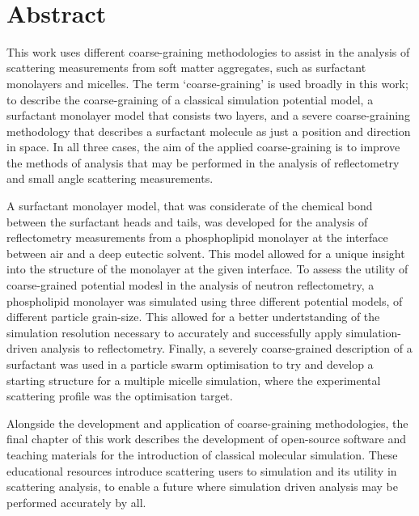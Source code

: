 \documentclass[twoside,symmetric,nobib]{./arm-thesis}
\newcommand{\blankpage}{\newpage\hbox{}\thispagestyle{empty}\newpage}
\begin{document}
\blankpage

\newpage

\begin{fullwidth}
\thispagestyle{empty}
\setlength{\parindent}{0pt}
\setlength{\parskip}{\baselineskip}
~\vfill
\chapter*{Abstract}
This work uses different coarse-graining methodologies to assist in the analysis of scattering measurements from soft matter aggregates, such as surfactant monolayers and micelles.
The term `coarse-graining' is used broadly in this work; to describe the coarse-graining of a classical simulation potential model, a surfactant monolayer model that consists two layers, and a severe coarse-graining methodology that describes a surfactant molecule as just a position and direction in space.
In all three cases, the aim of the applied coarse-graining is to improve the methods of analysis that may be performed in the analysis of reflectometry and small angle scattering measurements.

A surfactant monolayer model, that was considerate of the chemical bond between the surfactant heads and tails, was developed for the analysis of reflectometry measurements from a phosphoplipid monolayer at the interface between air and a deep eutectic solvent.
This model allowed for a unique insight into the structure of the monolayer at the given interface.
To assess the utility of coarse-grained potential modesl in the analysis of neutron reflectometry, a phospholipid monolayer was simulated using three different potential models, of different particle grain-size.
This allowed for a better undertstanding of the simulation resolution necessary to accurately and successfully apply simulation-driven analysis to reflectometry.
Finally, a severely coarse-grained description of a surfactant was used in a particle swarm optimisation to try and develop a starting structure for a multiple micelle simulation, where the experimental scattering profile was the optimisation target.

Alongside the development and application of coarse-graining methodologies, the final chapter of this work describes the development of open-source software and teaching materials for the introduction of classical molecular simulation.
These educational resources introduce scattering users to simulation and its utility in scattering analysis, to enable a future where simulation driven analysis may be performed accurately by all.
~\vfill
\end{fullwidth}
\end{document}
